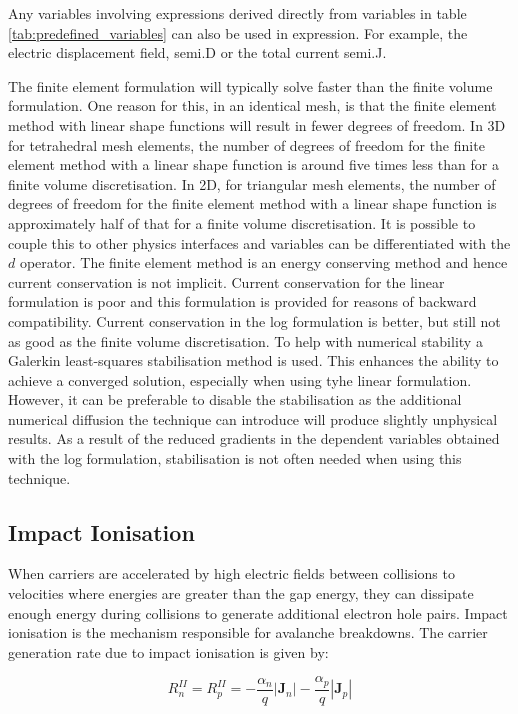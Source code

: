 Any variables involving expressions derived directly from variables in table \ref{tab:predefined_variables} can also be used in expression. For example, the electric displacement field, semi.D or the total current semi.J.

The finite element formulation will typically solve faster than the finite volume formulation. One reason for this, in an identical mesh, is that the finite element method with linear shape functions will result in fewer degrees of freedom. In 3D for tetrahedral mesh elements, the number of degrees of freedom for the finite element method with a linear shape function is around five times less than for a finite volume discretisation. In 2D, for triangular mesh elements, the number of degrees of freedom for the finite element method with a linear shape function is approximately half of that for a finite volume discretisation. It is possible to couple this to other physics interfaces and variables can be differentiated with the $d$ operator. The finite element method is an energy conserving method and hence current conservation is not implicit. Current conservation for the linear formulation is poor and this formulation is provided for reasons of backward compatibility. Current conservation in the log formulation is better, but still not as good as the finite volume discretisation. To help with numerical stability a Galerkin least-squares stabilisation method is used. This enhances the ability to achieve a converged solution, especially when using tyhe linear formulation. However, it can be preferable to disable the stabilisation as the additional numerical diffusion the technique can introduce will produce slightly unphysical results. As a result of the reduced gradients in the dependent variables obtained with the log formulation, stabilisation is not often needed when using this technique.

\subsection{Impact Ionisation}
When carriers are accelerated by high electric fields between collisions to velocities where energies are greater than the gap energy, they can dissipate enough energy during collisions to generate additional electron hole pairs. Impact ionisation is the mechanism responsible for avalanche breakdowns. The carrier generation rate due to impact ionisation is given by:

\begin{equation}
	R_{n}^{II}=R_{p}^{II}=-\frac{\alpha_{n}}{q}\left|\bm{J}_{n}\right|-\frac{\alpha_{p}}{q}\left|\bm{J}_{p}\right|
\end{equation}

